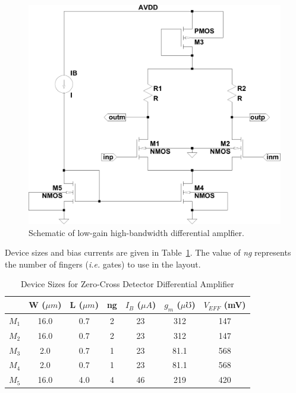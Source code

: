 \documentclass[12pt, onecolumn]{IEEEtran}
\begin{document}
\begin{figure}[htbp!]
	\centering
 	\includegraphics[scale=0.5,keepaspectratio=true]{./images/zc_dm_amp.pdf}
 	
 	\caption{Schematic of low-gain high-bandwidth differential amplfier.}
 	\label{FIG:ZC_DM_AMP}
 	
\end{figure}
 

Device sizes and bias currents are given in Table~\ref{TBL:ZC_DM_AMP}. The value of \emph{ng} represents the number of fingers (\emph{i.e.} gates) to use in the layout.\\ 


\begin{table} [htbp!]
\begin{center}
\begin{tabular}{|c|c|c|c|c|c|c|}
\hline 
 & W ($\mu m$) & L ($\mu m$) & ng & $I_B$ ($\mu A$) & $g_m$ ($\mu \mho$) & $V_{EFF}$ (mV)\\ 
\hline 
$M_1$ & 16.0 & 0.7 & 2 & 23 & 312 & 147 \\ 
\hline 
$M_2$ & 16.0 & 0.7 & 2 & 23 & 312 & 147 \\ 
\hline 
$M_3$ & 2.0 & 0.7 & 1 & 23 & 81.1 & 568 \\ 
\hline 
$M_4$ & 2.0 & 0.7 & 1 & 23 & 81.1 & 568 \\ 
\hline 
$M_5$ & 16.0 & 4.0 & 4 & 46 & 219 & 420 \\ 
\hline 
\end{tabular} 
\end{center}

\caption{Device Sizes for Zero-Cross Detector Differential Amplifier}
\label{TBL:ZC_DM_AMP}

\end{table}
\end{document}
